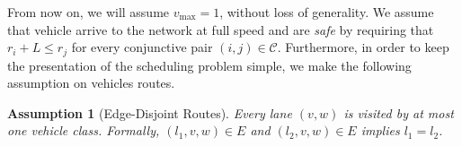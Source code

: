 \documentclass{article}
\theoremstyle{definition}
\theoremstyle{plain}
\newtheorem{assump}{Assumption}
\begin{document}

From now on, we will assume $v_{\max} = 1$, without loss of generality. We
assume that vehicle arrive to the network at full speed and are \textit{safe} by
requiring that $r_{i} + L \leq r_{j}$ for every conjunctive pair
$(i, j) \in \mathcal{C}$. Furthermore, in order to keep the presentation of the
scheduling problem simple, we make the following assumption on vehicles routes.
\begin{assump}[Edge-Disjoint Routes]\label{assump:edge_disjoint_routes}
  Every lane $(v,w)$ is visited by at most one vehicle class. Formally,
  $(l_{1},v,w) \in E$ and $(l_{2},v,w) \in E$ implies $l_{1}=l_{2}$.
\end{assump}
\end{document}
